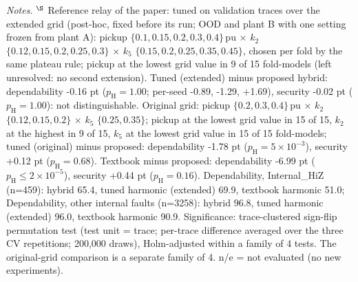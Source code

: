 \begin{table}[!htbp]
\vspace{3pt}\par\raggedright\footnotesize\textit{Notes.} $^{\S}$ Reference relay of the paper: tuned on validation traces over the extended grid (post-hoc, fixed before its run; OOD and plant B with one setting frozen from plant A): pickup $\{0.1, 0.15, 0.2, 0.3, 0.4\}$\,pu $\times$ $k_2$ $\{0.12, 0.15, 0.2, 0.25, 0.3\}$ $\times$ $k_5$ $\{0.15, 0.2, 0.25, 0.35, 0.45\}$, chosen per fold by the same plateau rule; pickup at the lowest grid value in 9 of 15 fold-models (left unresolved: no second extension). Tuned (extended) minus proposed hybrid: dependability -0.16 pt ($p_{\mathrm{H}}=1.00$; per-seed -0.89, -1.29, +1.69), security -0.02 pt ($p_{\mathrm{H}}=1.00$): not distinguishable. Original grid: pickup $\{0.2, 0.3, 0.4\}$\,pu $\times$ $k_2$ $\{0.12, 0.15, 0.2\}$ $\times$ $k_5$ $\{0.25, 0.35\}$; pickup at the lowest grid value in 15 of 15, $k_2$ at the highest in 9 of 15, $k_5$ at the lowest grid value in 15 of 15 fold-models; tuned (original) minus proposed: dependability -1.78 pt ($p_{\mathrm{H}}=5\times10^{-3}$), security +0.12 pt ($p_{\mathrm{H}}=0.68$). Textbook minus proposed: dependability -6.99 pt ($p_{\mathrm{H}}\le2\times10^{-5}$), security +0.44 pt ($p_{\mathrm{H}}=0.16$). Dependability, Internal\_HiZ (n=459): hybrid 65.4, tuned harmonic (extended) 69.9, textbook harmonic 51.0; Dependability, other internal faults (n=3258): hybrid 96.8, tuned harmonic (extended) 96.0, textbook harmonic 90.9. Significance: trace-clustered sign-flip permutation test (test unit = trace; per-trace difference averaged over the three CV repetitions; 200{,}000 draws), Holm-adjusted within a family of 4 tests. The original-grid comparison is a separate family of 4. n/e = not evaluated (no new experiments).
\end{table}